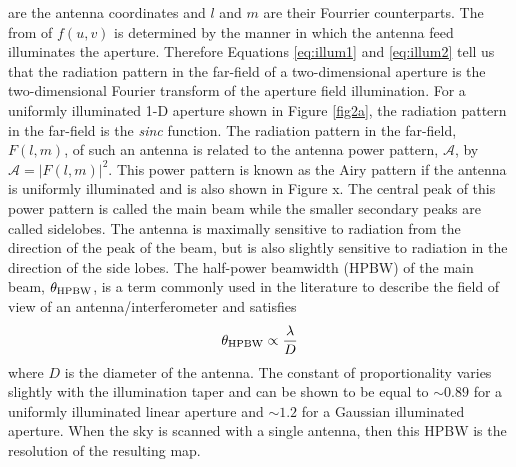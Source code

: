 are the antenna coordinates and $l$ and $m$ are their Fourrier counterparts. The from of $f(u,v)$ is determined by the manner in which the antenna feed illuminates the aperture. Therefore Equations \ref{eq:illum1} and \ref{eq:illum2} tell us that the radiation pattern in the far-field of a two-dimensional aperture is the two-dimensional Fourier transform of the aperture field illumination. For a uniformly illuminated 1-D aperture shown in Figure \ref{fig2a}, the radiation pattern in the far-field is the \textit{sinc} function. The radiation pattern in the far-field, $F(l,m)$, of such an antenna is related to the antenna power pattern, $\mathcal{A}$, by $\mathcal{A}=|F(l,m)|^2$. This power pattern is known as the Airy pattern if the antenna is uniformly illuminated and is also shown in Figure x. The central peak of this power pattern is called the main beam while the smaller secondary peaks are called sidelobes. The antenna is maximally sensitive to radiation from the direction of the peak of the beam, but is also slightly sensitive to radiation in the direction of the side lobes. The half-power beamwidth (HPBW) of the main beam, $\theta_{\rm{HPBW}}$, is a term commonly used in the literature to describe the field of view of an antenna/interferometer and satisfies 
\begin{equation}
\theta_{\rm{HPBW}} \propto \frac{\lambda}{D}
\end{equation}
where $D$ is the diameter of the antenna. The constant of proportionality varies slightly with the illumination taper and can be shown to be equal to $\sim 0.89$ for a uniformly illuminated linear aperture and $\sim 1.2$ for a Gaussian illuminated aperture. When the sky is scanned with a single antenna, then this HPBW is the resolution of the resulting map. 

